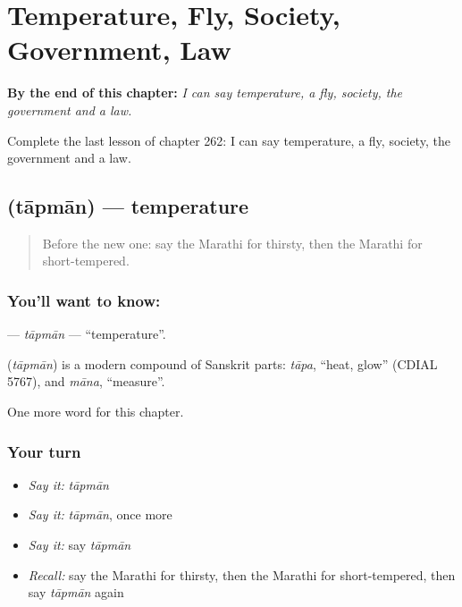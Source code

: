 
\chapter{Temperature, Fly, Society, Government, Law}
\label{ch:mr-temperature-fly-society-government-law}

\begin{chapteropening}
\textbf{By the end of this chapter:} \emph{I can say temperature, a fly, society, the government and a law.}

Complete the last lesson of chapter 262: I can say temperature, a fly, society, the government and a law.
\end{chapteropening}

\section[\texorpdfstring{\mr{तापमान} (tāpmān)}{तापमान (tāpmān)}]{ (tāpmān) — temperature}

\label{lesson:MR-C262-tapman}



\begin{quote}
Before the new one: say the Marathi for thirsty, then the Marathi for short-tempered.
\end{quote}

\subsection*{You'll want to know: }
\textbf{} — \emph{tāpmān} — \textquotedblleft{}temperature\textquotedblright{}.

\begin{cousinweb}
\textbf{} (\emph{tāpmān}) is a modern compound of Sanskrit parts: \emph{tāpa}, \textquotedblleft{}heat, glow\textquotedblright{} (CDIAL 5767), and \emph{māna}, \textquotedblleft{}measure\textquotedblright{}.
\end{cousinweb}

\begin{grammarlens}[title={What you've built}]
One more word for this chapter.
\end{grammarlens}

\subsection*{Your turn}
\begin{itemize}
\raggedright
  \item \emph{Say it:} \emph{tāpmān}
  \item \emph{Say it:} \emph{tāpmān}, once more
  \item \emph{Say it:} say \emph{tāpmān}
  \item \emph{Recall:} say the Marathi for thirsty, then the Marathi for short-tempered, then say \emph{tāpmān} again
\end{itemize}

